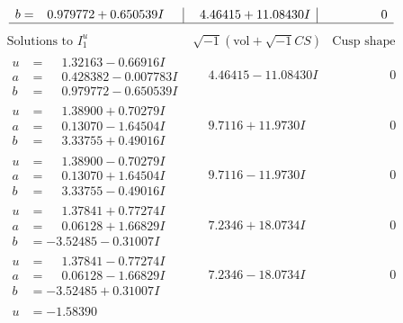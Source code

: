 \documentclass[1p]{elsarticle_modified}
\theoremstyle{definition}
\newcommand{\I}{\sqrt{-1}}
\begin{document}
$$\begin{array}{c|c|c}
\begin{aligned}
b &= \phantom{-}0.979772 + 0.650539 I\end{aligned}
 & \phantom{-}4.46415 + 11.08430 I & \phantom{-0.000000 } 0\\
 \hline 
 \end{array}$$\newpage$$\begin{array}{c|c|c}  
\text{Solutions to }I^u_{1}& \I (\text{vol} + \sqrt{-1}CS) & \text{Cusp shape}\\
 \hline 
\begin{aligned}
u &= \phantom{-}1.32163 - 0.66916 I \\
a &= \phantom{-}0.428382 - 0.007783 I \\
b &= \phantom{-}0.979772 - 0.650539 I\end{aligned}
 & \phantom{-}4.46415 - 11.08430 I & \phantom{-0.000000 } 0 \\ \hline\begin{aligned}
u &= \phantom{-}1.38900 + 0.70279 I \\
a &= \phantom{-}0.13070 - 1.64504 I \\
b &= \phantom{-}3.33755 + 0.49016 I\end{aligned}
 & \phantom{-}9.7116 + 11.9730 I & \phantom{-0.000000 } 0 \\ \hline\begin{aligned}
u &= \phantom{-}1.38900 - 0.70279 I \\
a &= \phantom{-}0.13070 + 1.64504 I \\
b &= \phantom{-}3.33755 - 0.49016 I\end{aligned}
 & \phantom{-}9.7116 - 11.9730 I & \phantom{-0.000000 } 0 \\ \hline\begin{aligned}
u &= \phantom{-}1.37841 + 0.77274 I \\
a &= \phantom{-}0.06128 + 1.66829 I \\
b &= -3.52485 - 0.31007 I\end{aligned}
 & \phantom{-}7.2346 + 18.0734 I & \phantom{-0.000000 } 0 \\ \hline\begin{aligned}
u &= \phantom{-}1.37841 - 0.77274 I \\
a &= \phantom{-}0.06128 - 1.66829 I \\
b &= -3.52485 + 0.31007 I\end{aligned}
 & \phantom{-}7.2346 - 18.0734 I & \phantom{-0.000000 } 0 \\ \hline\begin{aligned}
u &= -1.58390\phantom{ +0.000000I} \\

\end{aligned}
\end{array}$$
\end{document}
